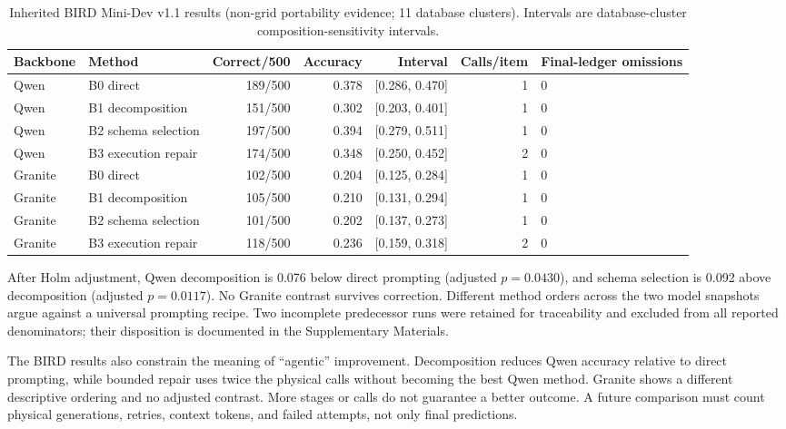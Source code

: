 \documentclass[information,article,submit,moreauthors]{Definitions/mdpi}
\begin{document}
\begin{table}[htbp]
\caption{Inherited BIRD Mini-Dev v1.1 results (non-grid portability evidence; 11 database clusters). Intervals are database-cluster composition-sensitivity intervals.}
\label{tab:bird}
\centering
\small
\setlength{\tabcolsep}{3pt}
\begin{tabular}{llrrrrp{1.5cm}}
\toprule
Backbone & Method & Correct/500 & Accuracy & Interval & Calls/item & Final-ledger omissions\\
\midrule
Qwen & B0 direct & 189/500 & 0.378 & [0.286, 0.470] & 1 & 0\\
Qwen & B1 decomposition & 151/500 & 0.302 & [0.203, 0.401] & 1 & 0\\
Qwen & B2 schema selection & 197/500 & 0.394 & [0.279, 0.511] & 1 & 0\\
\cmidrule(lr){1-7}
Qwen & B3 execution repair & 174/500 & 0.348 & [0.250, 0.452] & 2 & 0\\
Granite & B0 direct & 102/500 & 0.204 & [0.125, 0.284] & 1 & 0\\
Granite & B1 decomposition & 105/500 & 0.210 & [0.131, 0.294] & 1 & 0\\
Granite & B2 schema selection & 101/500 & 0.202 & [0.137, 0.273] & 1 & 0\\
\cmidrule(lr){1-7}
Granite & B3 execution repair & 118/500 & 0.236 & [0.159, 0.318] & 2 & 0\\
\bottomrule
\end{tabular}
\end{table}

After Holm adjustment, Qwen decomposition is 0.076 below direct prompting (adjusted $p=0.0430$), and schema selection is 0.092 above decomposition (adjusted $p=0.0117$). No Granite contrast survives correction. Different method orders across the two model snapshots argue against a universal prompting recipe. Two incomplete predecessor runs were retained for traceability and excluded from all reported denominators; their disposition is documented in the Supplementary Materials.

The BIRD results also constrain the meaning of ``agentic'' improvement. Decomposition reduces Qwen accuracy relative to direct prompting, while bounded repair uses twice the physical calls without becoming the best Qwen method. Granite shows a different descriptive ordering and no adjusted contrast. More stages or calls do not guarantee a better outcome. A future comparison must count physical generations, retries, context tokens, and failed attempts, not only final predictions.
\end{document}
